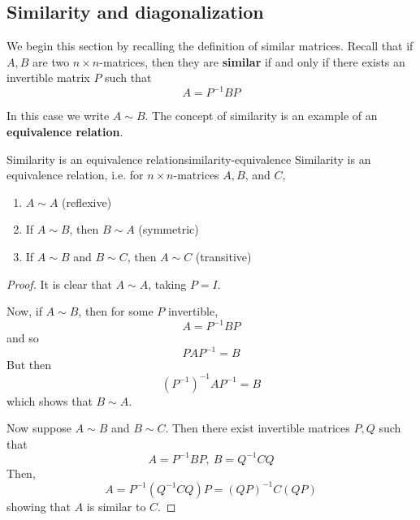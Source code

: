 \subsection{Similarity and diagonalization}

We begin this section by recalling the definition  of similar matrices. 
Recall that if $A,B$ are two $n\times n$-matrices, then they are \textbf{similar}
if and only if there exists an invertible matrix $P$
such that
\begin{equation*}
A=P^{-1}BP
\end{equation*}

In this case we write $A \sim B$. The concept of similarity is an example of an \textbf{equivalence relation}.

\begin{lemma}{Similarity is an equivalence relation}{similarity-equivalence}
Similarity is an equivalence relation, i.e. for $n \times n$-matrices $A,B$, and $C$, 
\begin{enumerate}
\item $A \sim A$ (reflexive)
\item If $A \sim B$, then $B \sim A$ (symmetric)
\item If $A \sim B$ and $B \sim C$, then $A \sim C$ (transitive)
\end{enumerate}
\end{lemma}

\begin{proof}
It is clear that $A\sim A$, taking $P=I$. 

Now, if $A\sim B$, then for some $P$ invertible,
\begin{equation*}
A=P^{-1}BP
\end{equation*}
and so
\begin{equation*}
PAP^{-1}=B
\end{equation*}
But then
\begin{equation*}
(P^{-1}) ^{-1}AP^{-1}=B
\end{equation*}
which shows that $B\sim A$.

Now suppose $A\sim B$ and $B\sim C$. Then there exist invertible matrices 
$P,Q$ such that
\begin{equation*}
A=P^{-1}BP,\ B=Q^{-1}CQ
\end{equation*}
Then,
\begin{equation*}
A=P^{-1} (Q^{-1}CQ)P=(QP) ^{-1}C(QP)
\end{equation*}
showing that $A$ is similar to $C$.
\end{proof}

